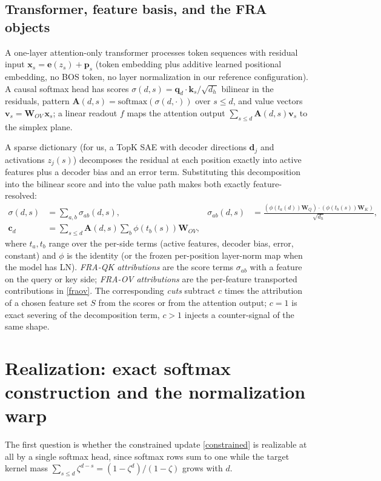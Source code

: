 \documentclass{article}
\newcommand{\xb}{\boldsymbol{x}}
\newcommand{\pb}{\boldsymbol{p}}
\newcommand{\vb}{\boldsymbol{v}}
\newcommand{\qb}{\boldsymbol{q}}
\newcommand{\kb}{\boldsymbol{k}}
\newcommand{\eb}{\boldsymbol{e}}
\newcommand{\db}{\boldsymbol{d}}
\newcommand{\cb}{\boldsymbol{c}}
\newcommand{\Ab}{\boldsymbol{A}}
\newcommand{\Wb}{\boldsymbol{W}}
\newcommand{\softmax}[1]{\textrm{softmax}(#1)}
\newcommand{\Wov}{\boldsymbol{W}_{OV}}
\theoremstyle{definition}
\begin{document}
\subsection{Transformer, feature basis, and the FRA objects}

A one-layer attention-only transformer processes token sequences with
residual input $\xb_s = \eb(z_s) + \pb_s$ (token embedding plus additive
learned positional embedding, no BOS token, no layer normalization in our
reference configuration). A causal softmax head has scores
$\sigma(d,s) = \qb_d \cdot \kb_s/\sqrt{d_h}$ bilinear in the residuals,
pattern $\Ab(d,s) = \softmax{\sigma(d,\cdot)}$ over $s \le d$, and value
vectors $\vb_s = \Wov\, \xb_s$; a linear readout $f$ maps the attention
output $\sum_{s\le d}\Ab(d,s)\vb_s$ to the simplex plane.

A sparse dictionary (for us, a TopK SAE with decoder directions $\db_j$ and
activations $z_j(s)$) decomposes the residual at each position exactly into
active features plus a decoder bias and an error term. Substituting this
decomposition into the bilinear score and into the value path makes both
exactly feature-resolved:
\begin{align}
\sigma(d,s) &= \sum_{a, b} \sigma_{ab}(d,s), &
\sigma_{ab}(d,s) &= \frac{(\phi(t_a(d))\Wb_Q)\cdot(\phi(t_b(s))\Wb_K)}{\sqrt{d_h}},
\label{fraqk}\\
\cb_d &= \sum_{s \le d} \Ab(d,s) \sum_b \phi(t_b(s))\Wov,
\label{fraov}
\end{align}
where $t_a, t_b$ range over the per-side terms (active features, decoder
bias, error, constant) and $\phi$ is the identity (or the frozen
per-position layer-norm map when the model has LN). \textit{FRA-QK
attributions} are the score terms $\sigma_{ab}$ with a feature on the query
or key side; \textit{FRA-OV attributions} are the per-feature transported
contributions in \eqref{fraov}. The corresponding \textit{cuts} subtract $c$
times the attribution of a chosen feature set $S$ from the scores or from
the attention output; $c = 1$ is exact severing of the decomposition term,
$c > 1$ injects a counter-signal of the same shape.

\section{Realization: exact softmax construction and the normalization warp}

The first question is whether the constrained update \eqref{constrained} is
realizable at all by a single softmax head, since softmax rows sum to one
while the target kernel mass $\sum_{s\le d}\zeta^{d-s} = (1-\zeta^d)/(1-\zeta)$
grows with $d$.
\end{document}
